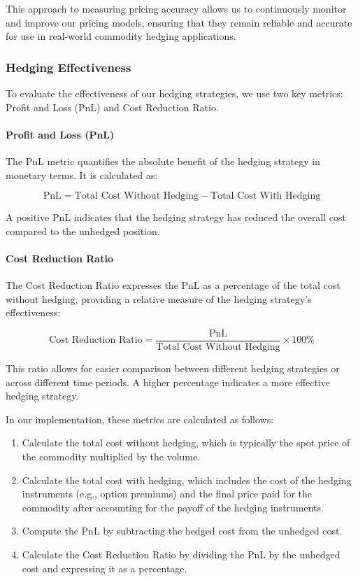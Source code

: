 \documentclass[12pt]{article}
\begin{document}
This approach to measuring pricing accuracy allows us to continuously monitor and improve our pricing models, ensuring that they remain reliable and accurate for use in real-world commodity hedging applications.

\subsubsection{Hedging Effectiveness}

To evaluate the effectiveness of our hedging strategies, we use two key metrics: Profit and Loss (PnL) and Cost Reduction Ratio.

\paragraph{Profit and Loss (PnL)}

The PnL metric quantifies the absolute benefit of the hedging strategy in monetary terms. It is calculated as:

\begin{equation}
    \text{PnL} = \text{Total Cost Without Hedging} - \text{Total Cost With Hedging}
\end{equation}

A positive PnL indicates that the hedging strategy has reduced the overall cost compared to the unhedged position.

\paragraph{Cost Reduction Ratio}

The Cost Reduction Ratio expresses the PnL as a percentage of the total cost without hedging, providing a relative measure of the hedging strategy's effectiveness:

\begin{equation}
    \text{Cost Reduction Ratio} = \frac{\text{PnL}}{\text{Total Cost Without Hedging}} \times 100\%
\end{equation}

This ratio allows for easier comparison between different hedging strategies or across different time periods. A higher percentage indicates a more effective hedging strategy.

In our implementation, these metrics are calculated as follows:

\begin{enumerate}
    \item Calculate the total cost without hedging, which is typically the spot price of the commodity multiplied by the volume.
    \item Calculate the total cost with hedging, which includes the cost of the hedging instruments (e.g., option premiums) and the final price paid for the commodity after accounting for the payoff of the hedging instruments.
    \item Compute the PnL by subtracting the hedged cost from the unhedged cost.
    \item Calculate the Cost Reduction Ratio by dividing the PnL by the unhedged cost and expressing it as a percentage.
\end{enumerate}
\end{document}
